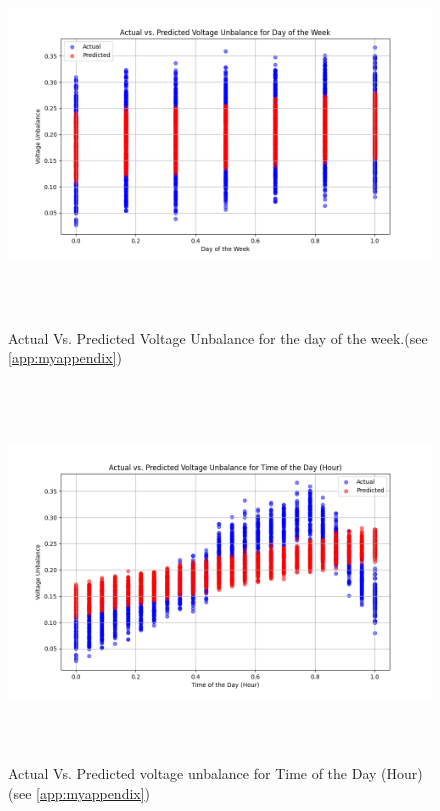 \documentclass[a4paper,12pt,oneside]{book}
\begin{document}
  \begin{figure}[ht]
    \centering
    \includegraphics[height=10cm]{Figures/predicted_data/Actual vs. Predicted Voltage Unbalance for Day of the Week.png} 
    \caption{Actual Vs. Predicted Voltage Unbalance for the day of the week.(see \autoref{app:myappendix})}
    \label{fig:voltage-drops}
  \end{figure}


  \begin{figure}[ht]
    \centering
    \includegraphics[height=10cm]{Figures/predicted_data/Actual vs. Predicted Voltage Unbalance for Time of the Day (Hour).png} 
    \caption{Actual Vs. Predicted voltage unbalance for Time of the Day (Hour)(see \autoref{app:myappendix})}
    \label{fig:voltage-drops}
  \end{figure}
\end{document}
